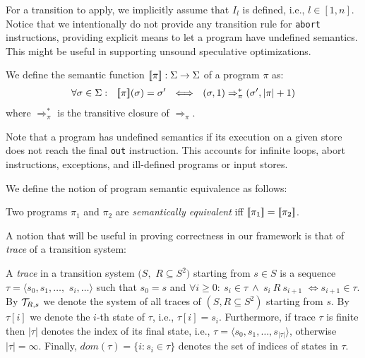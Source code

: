 \noindent For a transition to apply, we implicitly assume that $I_l$ is defined, i.e., $l\in[1,n]$. 
\ifx\noauthorea\undefined
Notice that we intentionally do not provide any transition rule for {\tt abort} instructions, providing explicit means to let a program have undefined semantics. This might be useful in supporting unsound speculative optimizations.
\fi

\begin{definition}
\label{de:program-semantics}
We define the semantic function $[\![\pi]\!]:\Sigma \rightarrow \Sigma$ of a program $\pi$ as: 
\begin{gather*}
\forall \sigma\in\Sigma: ~~ \mysem{\pi}(\sigma)=\sigma'~~%
\Longleftrightarrow ~~ (\sigma,1) \Rightarrow^{*}_{\pi} (\sigma',|\pi|+1)
\end{gather*}
where $\Rightarrow^{*}_{\pi}$ is the transitive closure of $\Rightarrow_{\pi}$.
\end{definition}

\noindent Note that a program has undefined semantics if its execution on a given store does not reach the final \texttt{out} instruction. This accounts for infinite loops, abort instructions, exceptions, and ill-defined programs or input stores. 

We define the notion of program semantic equivalence as follows:

\begin{definition}
\label{de:semantic-equivalence}
Two programs $\pi_1$ and $\pi_2$ are {\em semantically equivalent} iff $[\![\pi_1]\!]=[\![\pi_2]\!]$.
\end{definition}

\noindent A notion that will be useful in proving correctness in our framework is that of {\em trace} of a transition system:

\begin{definition}[Traces]
\label{de:exec-trace}
A {\em trace} in a transition system $(S,$ $R\subseteq S^2)$ starting from $s\in S$ is a sequence $\tau=\langle s_0,s_1,\ldots,$ $s_i,\ldots\rangle$ such that $s_0=s$ and $\forall i\ge 0:~s_i\in\tau ~ \wedge ~ s_i~R~s_{i+1}$ $\Longleftrightarrow s_{i+1}\in\tau$. By ${\cal T}_{R,s}$ we denote the system of all traces of $(S,R\subseteq S^2)$ starting from $s$. By $\tau[i]$ we denote the $i$-th state of $\tau$, i.e., $\tau[i]=s_i$. Furthermore, if trace $\tau$ is finite then $|\tau|$ denotes the index of its final state, i.e., $\tau=\langle s_0,s_1,\ldots,s_{|\tau|}\rangle$, otherwise $|\tau|=\infty$. Finally, $dom(\tau)=\{i:s_i\in\tau\}$ denotes the set of indices of states in $\tau$.
\end{definition}


